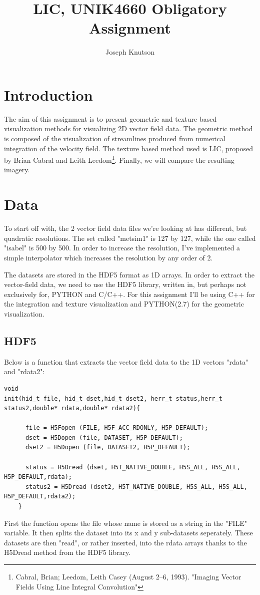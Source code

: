 \documentclass[a4paper,10pt]{report}
\title{LIC, UNIK4660 Obligatory Assignment}
\author{Joseph Knutson}
\begin{document}
\maketitle
\section*{Introduction}
The aim of this assignment is to present geometric and texture based visualization methods for visualizing 2D vector field data. The geometric method is composed of the visualization of streamlines produced from numerical integration of the velocity field.
The texture based method used is LIC, proposed by Brian Cabral and Leith Leedom\footnote[1]{Cabral, Brian; Leedom, Leith Casey (August 2–6, 1993). "Imaging Vector Fields Using Line Integral Convolution"}. Finally, we will compare the resulting imagery.


\section*{Data}
To start off with, the 2 vector field data files we're looking at has different, but quadratic resolutions. The set called "metsim1" is 127 by 127, while the one called "isabel" is 500 by 500. In order to increase the resolution, I've implemented a simple interpolator which increases the resolution by any order of 2.

The datasets are stored in the HDF5 format as 1D arrays. In order to extract the vector-field data, we need to use the HDF5 library, written in, but perhaps not exclusively for, PYTHON and C/C++.
For this assignment I'll be using C++ for the integration and texture visualization and PYTHON(2.7) for the geometric visualization.

\subsection*{HDF5}

Below is a function that extracts the vector field data to the 1D vectors "rdata" and "rdata2":
\begin{lstlisting}
void 
init(hid_t file, hid_t dset,hid_t dset2, herr_t status,herr_t status2,double* rdata,double* rdata2){

      file = H5Fopen (FILE, H5F_ACC_RDONLY, H5P_DEFAULT);
      dset = H5Dopen (file, DATASET, H5P_DEFAULT);
      dset2 = H5Dopen (file, DATASET2, H5P_DEFAULT);

      status = H5Dread (dset, H5T_NATIVE_DOUBLE, H5S_ALL, H5S_ALL, H5P_DEFAULT,rdata);
      status2 = H5Dread (dset2, H5T_NATIVE_DOUBLE, H5S_ALL, H5S_ALL, H5P_DEFAULT,rdata2);
    }
\end{lstlisting}
First the function opens the file whose name is stored as a string in the "FILE" variable.
It then splits the dataset into its x and y sub-datasets seperately. These datasets are then "read", or rather inserted, into the rdata arrays thanks to the H5Dread method from the HDF5 library.
\end{document}
